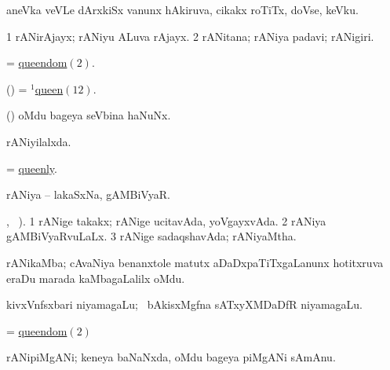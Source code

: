 \bentry
{} 
\gl{\nA}
\bmng
aneVka veVLe dArxkiSx \mo vanunx hAkiruva, cikakx roTiTx, doVse, keVku. 
\emng
\eentry

\bentry
{} 
\gl{\nA}
\expl{}
\bmng
\bnum
\num{1} rANirAjayx; rANiyu ALuva rAjayx. 
\hypertarget{queendom(2)}{} 
\num{2} rANitana; rANiya padavi; rANigiri. 
\enum
\emng
\eentry

\bentry
{} 
\gl{\nA}
\expl{}
\bmng
 = \hyperlink{queendom(2)}{queendom\((2)\)}. 
\emng
\eentry

\bentry
{} 
\gl{\nA}
\expl{}
\bmng
(\ashi) = \hyperlink{queen(1)12}{$^1$queen\((12)\)}. 
\emng
\eentry

\bentry
{} 
\gl{\nA}
\expl{}
\bmng
(\birx) oMdu bageya seVbina haNuNx. 
\emng
\eentry

\bentry
{} 
\gl{\gu}
\expl{}
\bmng
rANiyilalxda. 
\emng
\eentry

\bentry
{} 
\gl{\gu}
\expl{}
\bmng
= \hyperlink{queenly}{queenly}. 
\emng
\eentry

\bentry
{} 
\gl{\nA}
\bmng
rANiya -- lakaSxNa, gAMBiVyaR. 
\emng
\eentry

\bentry
{} 
\gl{\gu}
\expl{(\tara\ }
, \tama\ ). \bmng
\bnum
\num{1} rANige takakx; rANige ucitavAda, yoVgayxvAda. 
\num{2} rANiya gAMBiVyaRvuLaLx. 
\num{3} rANige sadaqshavAda; rANiyaMtha. 
\enum
\emng
\eentry

\bentry
{} 
\gl{\nA}
\bmng
rANikaMba; cAvaNiya benanxtole matutx aDaDxpaTiTxgaLanunx hotitxruva eraDu marada kaMbagaLalilx oMdu.  
\emng
\eentry

\bentry
{}
\gl{\nA}
\expl{(\bava) }
\bmng
kivxVnfsxbari niyamagaLu; \kanmu\ bAkisxMgfna sATxyXMDaDfR niyamagaLu. 
\emng
\eentry

\bentry
{} 
\gl{\nA}
\expl{}
\bmng
= \hyperlink{queendom(2)}{queendom\((2)\)} 
\emng
\eentry

\bentry
{} 
\gl{\nA}
\expl{}
\bmng
rANipiMgANi; keneya baNaNxda, oMdu bageya piMgANi sAmAnu. 
\emng
\eentry

